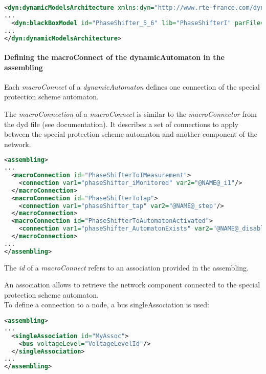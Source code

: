 \documentclass[a4paper, 12pt]{report}
\begin{document}
\begin{lstlisting}[language=XML, breaklines=true, breakatwhitespace=false, columns=fullflexible]
<dyn:dynamicModelsArchitecture xmlns:dyn="http://www.rte-france.com/dynawo">
...
  <dyn:blackBoxModel id="PhaseShifter_5_6" lib="PhaseShifterI" parFile="TestIIDM_phase_shifter.par" parId="PhaseShifter_5_6"/>
...
</dyn:dynamicModelsArchitecture>
\end{lstlisting}

\paragraph{Defining the macroConnect of the dynamicAutomaton in the assembling\\}

Each \textit{macroConnect} of a \textit{dynamicAutomaton} defines one connection of the special protection scheme automaton.

The \textit{macroConnection} of a \textit{macroConnect} is similar to the \Dynawo \textit{macroConnector} from the dyd file (see \Dynawo documentation). It describes a set
of connections to apply between the special protection scheme automaton and another component of the network.

 \begin{lstlisting}[language=XML, breaklines=true, breakatwhitespace=false, columns=fullflexible]
<assembling>
...
  <macroConnection id="PhaseShifterToIMeasurement">
    <connection var1="phaseShifter_iMonitored" var2="@NAME@_i1"/>
  </macroConnection>
  <macroConnection id="PhaseShifterToTap">
    <connection var1="phaseShifter_tap" var2="@NAME@_step"/>
  </macroConnection>
  <macroConnection id="PhaseShifterToAutomatonActivated">
    <connection var1="phaseShifter_AutomatonExists" var2="@NAME@_disable_internal_tapChanger"/>
  </macroConnection>
...
</assembling>
\end{lstlisting}

The \textit{id} of a \textit{macroConnect} refers to an association provided in the assembling.

An association allows to retrieve the network component connected to the special protection scheme automaton. \\

To define a connection to a node, a bus singleAssociation is used:
 \begin{lstlisting}[language=XML, breaklines=true, breakatwhitespace=false, columns=fullflexible]
<assembling>
...
  <singleAssociation id="MyAssoc">
    <bus voltageLevel="VoltageLevelId"/>
  </singleAssociation>
...
</assembling>
\end{lstlisting}
\end{document}
